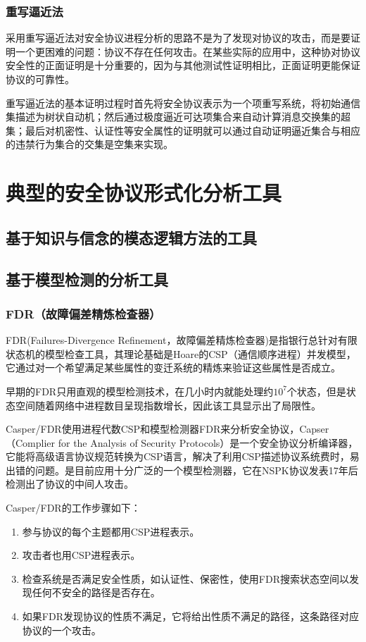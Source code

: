 \documentclass[cs4size,a4pape,UTF8]{ctexart}
\numberwithin{equation}{section}
\numberwithin{table}{section}
\numberwithin{figure}{section}
\begin{document}
\subsubsection{重写逼近法}
采用重写逼近法对安全协议进程分析的思路不是为了发现对协议的攻击，而是要证明一个更困难的问题：协议不存在任何攻击。在某些实际的应用中，这种协对协议安全性的正面证明是十分重要的，因为与其他测试性证明相比，正面证明更能保证协议的可靠性。

重写逼近法的基本证明过程时首先将安全协议表示为一个项重写系统，将初始通信集描述为树状自动机；然后通过极度逼近可达项集合来自动计算消息交换集的超集；最后对机密性、认证性等安全属性的证明就可以通过自动证明逼近集合与相应的违禁行为集合的交集是空集来实现。
\section{典型的安全协议形式化分析工具}
\subsection{基于知识与信念的模态逻辑方法的工具}
\subsection{基于模型检测的分析工具}
\subsubsection{FDR（故障偏差精炼检查器）}
FDR(Failures-Divergence Refinement，故障偏差精炼检查器)是指银行总针对有限状态机的模型检查工具，其理论基础是Hoare的CSP（通信顺序进程）并发模型，它通过对一个希望满足某些属性的变迁系统的精炼来验证这些属性是否成立。

早期的FDR只用直观的模型检测技术，在几小时内就能处理约$10^{7}$个状态，但是状态空间随着网络中进程数目呈现指数增长，因此该工具显示出了局限性。

Casper/FDR使用进程代数CSP和模型检测器FDR来分析安全协议，Capser（Complier for the Analysis of Security Protocols）是一个安全协议分析编译器，它能将高级语言协议规范转换为CSP语言，解决了利用CSP描述协议系统费时，易出错的问题。是目前应用十分广泛的一个模型检测器，它在NSPK协议发表17年后检测出了协议的中间人攻击。

Casper/FDR的工作步骤如下：

\begin{enumerate}[(1)]
\item 参与协议的每个主题都用CSP进程表示。
\item 攻击者也用CSP进程表示。
\item 检查系统是否满足安全性质，如认证性、保密性，使用FDR搜索状态空间以发现任何不安全的路径是否存在。
\item 如果FDR发现协议的性质不满足，它将给出性质不满足的路径，这条路径对应协议的一个攻击\cite{1}。
\end{enumerate}
\end{document}
